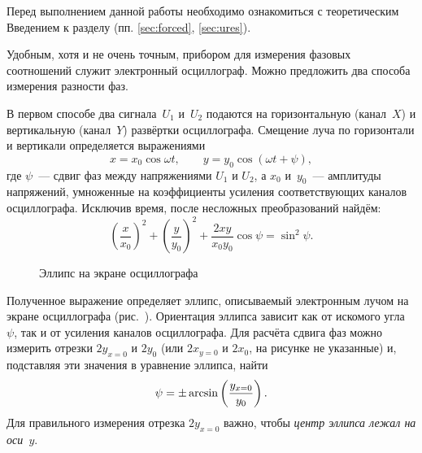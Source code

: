 \label{lab:phase}



Перед выполнением данной работы необходимо ознакомиться с теоретическим
Введением к разделу (пп. \ref{sec:forced}, \ref{sec:ures}).

Удобным, хотя и не очень точным, прибором для измерения фазовых соотношений 
служит электронный осциллограф. Можно предложить два способа измерения разности фаз.

В первом способе два сигнала~$U_1$ и~$U_2$ подаются 
на горизонтальную (канал~$X$) и вертикальную (канал~$Y$) развёртки осциллографа. 
Смещение луча по горизонтали и вертикали определяется выражениями
\begin{equation*}
x=x_0\cos\omega t,\qquad y=y_0\cos(\omega t+\psi),
\end{equation*}
где $\psi$~--- сдвиг фаз между напряжениями $U_1$ и $U_2$, а $x_0$ и~$y_0$~---
амплитуды напряжений, умноженные на
коэффициенты усиления соответствующих каналов осциллографа. Исключив время,
после несложных преобразований найдём:
\begin{equation*}
\left(\frac{x}{x_0}\right)^2+ \left(\frac{y}{y_0}\right)^2+ \frac{2xy}{x_0 y_0}
\cos\psi=\sin^2 \psi.
\end{equation*}

\begin{wrapfigure}[13]{r}{0.45\linewidth}
	\caption{Эллипс на экране осциллографа}
\end{wrapfigure}

Полученное выражение определяет эллипс, описываемый электронным лучом на 
экране осциллографа (рис.~). Ориентация эллипса зависит как от искомого 
угла~$\psi$, так и от усиления каналов осциллографа. Для расчёта сдвига фаз 
можно измерить отрезки $2y_{x=0}$ и $2y_0$ (или $2x_{y=0}$ и $2x_0$, 
на рисунке не указанные) и, подставляя эти значения в уравнение эллипса, найти
\begin{equation}
\eqmark{phasexy}
\psi=\pm\arcsin\left(\frac{y_{x=0}}{y_0}\right).
\end{equation}
Для правильного измерения отрезка $2y_{x=0}$ важно, чтобы 
\emph{центр     эллипса лежал на оси~$y$}.

